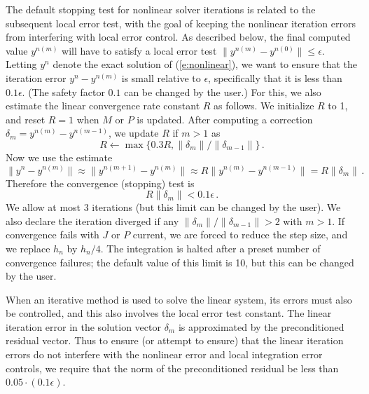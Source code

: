 The default stopping test for nonlinear solver iterations is related to the
subsequent local error test, with the goal of keeping the nonlinear
iteration errors from interfering with local error control.  As
described below, the final computed value $y^{n(m)}$ will have to
satisfy a local error test $\|y^{n(m)} - y^{n(0)}\| \leq \epsilon$.
Letting $y^n$ denote the exact solution of (\ref{e:nonlinear}), we want
to ensure that the iteration error $y^n - y^{n(m)}$ is small relative
to $\epsilon$, specifically that it is less than $0.1 \epsilon$.
(The safety factor $0.1$ can be changed by the user.)  For this, we
also estimate the linear convergence rate constant $R$ as follows.
We initialize $R$ to 1, and reset $R = 1$ when $M$ or $P$ is updated.
After computing a correction $\delta_m = y^{n(m)}-y^{n(m-1)}$, we
update $R$ if $m > 1$ as
\begin{equation*}
  R \leftarrow \max\{0.3R , \|\delta_m\| / \|\delta_{m-1}\| \} \, .
\end{equation*}
Now we use the estimate
\begin{equation*}
  \| y^n - y^{n(m)} \| \approx \| y^{n(m+1)} - y^{n(m)} \|
  \approx R \| y^{n(m)} - y^{n(m-1)} \|  =  R \|\delta_m \| \, .
\end{equation*}
Therefore the convergence (stopping) test is
\begin{equation*}
  R \|\delta_m \| < 0.1 \epsilon \, .
\end{equation*}
We allow at most 3 iterations (but this limit can be changed by the
user).  We also declare the iteration diverged if any $\|\delta_m\| /
\|\delta_{m-1}\| > 2$ with $m > 1$. If convergence fails with $J$ or
$P$ current, we are forced to reduce the step size, and we replace
$h_n$ by $h_n/4$.  The integration is halted after a preset number
of convergence failures; the default value of this limit is 10,
but this can be changed by the user.

When an iterative method is used to solve the linear system, its
errors must also be controlled, and this also involves the local error
test constant.  The linear iteration error in the solution vector
$\delta_m$ is approximated by the preconditioned residual vector.
Thus to ensure (or attempt to ensure) that the linear iteration errors
do not interfere with the nonlinear error and local integration error
controls, we require that the norm of the preconditioned residual
be less than $0.05 \cdot (0.1 \epsilon)$.

